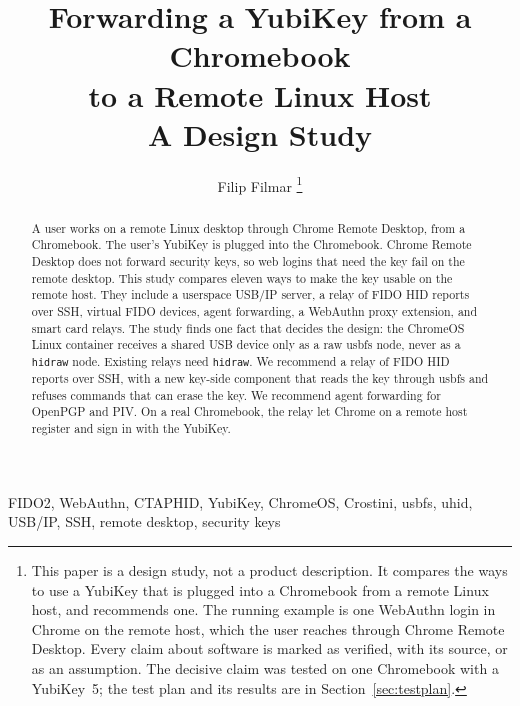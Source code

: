 \documentclass[journal,9pt]{IEEEtran}
\title{Forwarding a YubiKey from a Chromebook\\to a Remote Linux Host\\{\large A Design Study}}
\author{Filip Filmar%
\thanks{This paper is a design study, not a product description.
It compares the ways to use a YubiKey that is plugged into a Chromebook
from a remote Linux host, and recommends one.
The running example is one WebAuthn login in Chrome on the remote host,
which the user reaches through Chrome Remote Desktop.
Every claim about software is marked as verified, with its source, or as an
assumption. The decisive claim was tested on one Chromebook with a
YubiKey~5; the test plan and its results are in
Section~\ref{sec:testplan}.}}
\theoremstyle{definition}
\theoremstyle{remark}
\newcommand{\code}[1]{\texttt{#1}}
\begin{document}
\maketitle

\begin{abstract}
A user works on a remote Linux desktop through Chrome Remote Desktop, from a
Chromebook. The user's YubiKey is plugged into the Chromebook. Chrome Remote
Desktop does not forward security keys, so web logins that need the key fail
on the remote desktop. This study compares eleven ways to make the key usable
on the remote host. They include a userspace USB/IP server, a relay of FIDO
HID reports over SSH, virtual FIDO devices, agent forwarding, a WebAuthn
proxy extension, and smart card relays. The study finds one fact that decides
the design: the ChromeOS Linux container receives a shared USB device only as
a raw usbfs node, never as a \code{hidraw} node. Existing relays need
\code{hidraw}. We recommend a relay of FIDO HID reports over SSH, with a new
key-side component that reads the key through usbfs and refuses commands that
can erase the key. We recommend agent forwarding for OpenPGP and PIV. On a real Chromebook,
the relay let Chrome on a remote host register and sign in with the
YubiKey.
\end{abstract}

\begin{IEEEkeywords}
FIDO2, WebAuthn, CTAPHID, YubiKey, ChromeOS, Crostini, usbfs, uhid, USB/IP,
SSH, remote desktop, security keys
\end{IEEEkeywords}

{\footnotesize\tableofcontents}













\appendices


\end{document}
